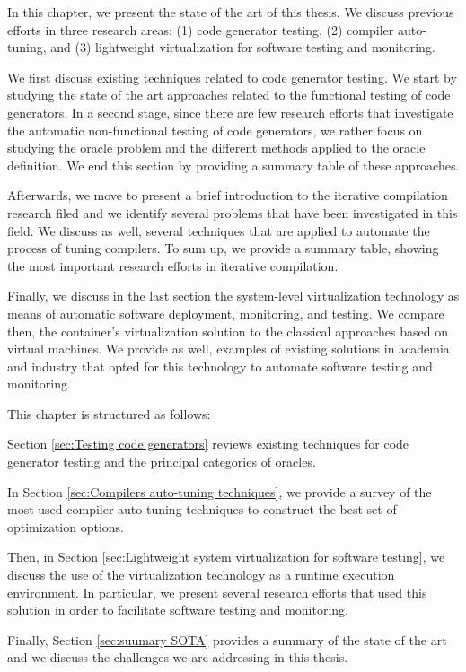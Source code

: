 
In this chapter, we present the state of the art of this thesis. We discuss previous efforts in three research areas: (1) code generator testing, (2) compiler auto-tuning, and (3) lightweight virtualization for software testing and monitoring.

We first discuss existing techniques related to code generator testing. We start by studying the state of the art approaches related to the functional testing of code generators. In a second stage, since there are few research efforts that investigate the automatic non-functional testing of code generators, we rather focus on studying the oracle problem and the different methods applied to the oracle definition. We end this section by providing a summary table of these approaches.

Afterwards, we move to present a brief introduction to the iterative compilation research filed and we identify several problems that have been investigated in this field. We discuss as well, several techniques that are applied to automate the process of tuning compilers. To sum up, we provide a summary table, showing the most important research efforts in iterative compilation.

Finally, we discuss in the last section the system-level virtualization technology as means of automatic software deployment, monitoring, and testing. We compare then, the container's virtualization solution to the classical approaches based on virtual machines. We provide as well, examples of existing solutions in academia and industry that opted for this technology to automate software testing and monitoring.

This chapter is structured as follows: 

Section \ref{sec:Testing code generators} reviews existing techniques for code generator testing and the principal categories of oracles. 

In Section \ref{sec:Compilers auto-tuning techniques}, we provide a survey of the most used compiler auto-tuning techniques to construct the best set of optimization options. 

Then, in Section \ref{sec:Lightweight system virtualization for software testing}, we discuss the use of the virtualization technology as a runtime execution environment. In particular, we present several research efforts that used this solution in order to facilitate software testing and monitoring. 

Finally, Section \ref{sec:suumary SOTA} provides a summary of the state of the art and we discuss the challenges we are addressing in this thesis.

